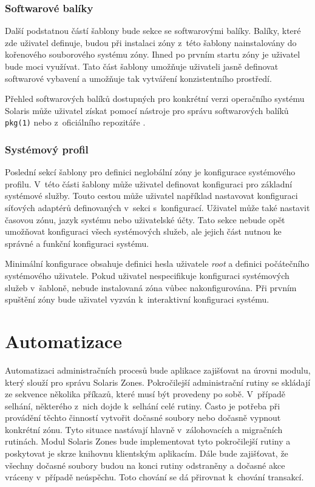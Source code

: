 \subsubsection{Softwarové balíky}
\label{chapter:design:templates:zones:manifest}
Další podstatnou částí šablony bude sekce se softwarovými balíky. Balíky, které zde uživatel definuje, budou při instalaci
zóny z~této šablony nainstalovány do kořenového souborového systému zóny. Ihned po prvním startu zóny je uživatel bude moci
využívat. Tato část šablony umožňuje uživateli jasně definovat softwarové vybavení a umožňuje tak vytváření konzistentního
prostředí.

Přehled softwarových balíků dostupných pro konkrétní verzi operačního systému Solaris může uživatel získat pomocí nástroje
pro správu softwarových balíků \verb|pkg(1)| nebo z~oficiálního repozitáře \cite{oracle:solaris:desing:pkg_repository}.
\subsubsection{Systémový profil}
\label{chapter:design:templates:zones:profile}
Poslední sekcí šablony pro definici neglobální zóny je konfigurace systémového profilu. V~této části šablony může uživatel
definovat konfiguraci pro základní systémové služby. Touto cestou může uživatel například nastavovat konfiguraci síťových
adaptérů definovaných v~sekci s~konfigurací. Uživatel může také nastavit časovou zónu, jazyk systému nebo uživatelské účty.
Tato sekce nebude opět umožňovat konfiguraci všech systémových služeb, ale jejich část nutnou ke správné a funkční konfiguraci
systému.

Minimální konfigurace obsahuje definici hesla uživatele \textit{root} a definici počátečního systémového uživatele. Pokud uživatel
nespecifikuje konfiguraci systémových služeb v~šabloně, nebude instalovaná zóna vůbec nakonfigurována. Při prvním spuštění
zóny bude uživatel vyzván k~interaktivní konfiguraci systému.
\section{Automatizace}
\label{chapter:design:automation}
Automatizaci administračních procesů bude aplikace zajišťovat na úrovni modulu, který slouží pro správu Solaris Zones. Pokročilejší
administrační rutiny se skládají ze sekvence několika příkazů, které musí být provedeny po sobě. V~případě selhání, některého
z~nich dojde k~selhání celé rutiny. Často je potřeba při provádění těchto činností vytvořit dočasné soubory nebo dočasně 
vypnout konkrétní zónu. Tyto situace nastávají hlavně v~zálohovacích a migračních rutinách. Modul Solaris Zones bude implementovat
tyto pokročilejší rutiny a poskytovat je skrze knihovnu klientským aplikacím. Dále bude zajišťovat, že všechny dočasné soubory
budou na konci rutiny odstraněny a dočasné akce vráceny v~případě neúspěchu. Toto chování se dá přirovnat k~chování transakcí.


